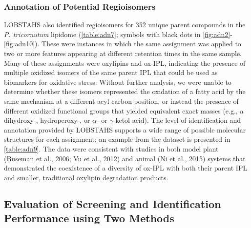 \subsubsection{Annotation of Potential Regioisomers}

LOBSTAHS also identified regioisomers for 352 unique parent compounds in the \emph{P. tricornutum} lipidome (\autoref{table:adn7}; symbols with black dots in \autoref{fig:adn2}-\autoref{fig:adn10}). These were instances in which the same assignment was applied to two or more features appearing at different retention times in the same sample. Many of these assignments were oxylipins and ox-IPL, indicating the presence of multiple oxidized isomers of the same parent IPL that could be used as biomarkers for oxidative stress. Without further analysis, we were unable to determine whether these isomers represented the oxidation of a fatty acid by the same mechanism at a different acyl carbon position, or instead the presence of different oxidized functional groups that yielded equivalent exact masses (e.g., a dihydroxy-, hydroperoxy-, or $\alpha$- or $\gamma$-ketol acid). The level of identification and annotation provided by LOBSTAHS supports a wide range of possible molecular structures for each assignment; an example from the dataset is presented in \autoref{table:adn9}. The data were consistent with studies in both model plant (Buseman et al., 2006; Vu et al., 2012) and animal (Ni et al., 2015) systems that demonstrated the coexistence of a diversity of ox-IPL with both their parent IPL and smaller, traditional oxylipin degradation products.

\subsection{Evaluation of Screening and Identification Performance using Two Methods}


